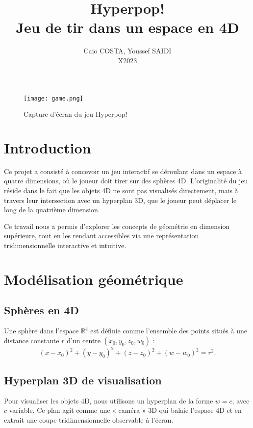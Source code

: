 \documentclass[11pt,a4paper]{article}
\title{Hyperpop! \\ \normalsize{Jeu de tir dans un espace en 4D}}
\author{Caio COSTA, Youssef SAIDI \\ X2023}
\date{}
\begin{document}
\maketitle

\tableofcontents

\begin{figure}[H]
    \centering
    \texttt{[image: game.png]}
    \caption{Capture d'écran du jeu Hyperpop!}
    \label{fig:screenshot-game}
\end{figure}

\section{Introduction}

Ce projet a consisté à concevoir un jeu interactif se déroulant dans un espace à quatre dimensions, où le joueur doit tirer sur des sphères 4D. L’originalité du jeu réside dans le fait que les objets 4D ne sont pas visualisés directement, mais à travers leur intersection avec un hyperplan 3D, que le joueur peut déplacer le long de la quatrième dimension.

Ce travail nous a permis d'explorer les concepts de géométrie en dimension supérieure, tout en les rendant accessibles via une représentation tridimensionnelle interactive et intuitive.

\section{Modélisation géométrique}

\subsection{Sphères en 4D}

Une sphère dans l’espace $\mathbb{R}^4$ est définie comme l’ensemble des points situés à une distance constante $r$ d’un centre $(x_0, y_0, z_0, w_0)$ :
\[
	(x - x_0)^2 + (y - y_0)^2 + (z - z_0)^2 + (w - w_0)^2 = r^2.
\]

\subsection{Hyperplan 3D de visualisation}

Pour visualiser les objets 4D, nous utilisons un hyperplan de la forme $w = c$, avec $c$ variable. Ce plan agit comme une « caméra » 3D qui balaie l’espace 4D et en extrait une coupe tridimensionnelle observable à l’écran.
\end{document}
